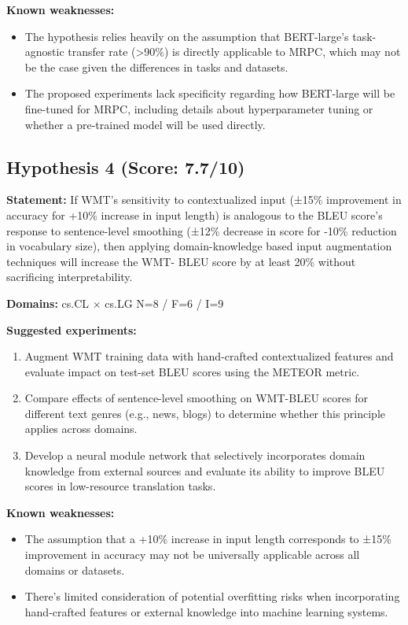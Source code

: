 \documentclass[12pt,a4paper]{article}
\begin{document}
\textbf{Known weaknesses:}
\begin{itemize}
  \item The hypothesis relies heavily on the assumption that BERT-large's task-agnostic transfer rate (>90\%) is directly applicable to MRPC, which may not be the case given the differences in tasks and datasets.
  \item The proposed experiments lack specificity regarding how BERT-large will be fine-tuned for MRPC, including details about hyperparameter tuning or whether a pre-trained model will be used directly.
\end{itemize}
\subsection*{Hypothesis 4 (Score: 7.7/10)}

\textbf{Statement:} If WMT's sensitivity to contextualized input (±15\% improvement in accuracy for +10\% increase in input length) is analogous to the BLEU score's response to sentence-level smoothing (±12\% decrease in score for -10\% reduction in vocabulary size), then applying domain-knowledge based input augmentation techniques will increase the WMT- BLEU score by at least 20\% without sacrificing interpretability.

\noindent\textbf{Domains:} cs.CL $\times$ cs.LG
\hspace{1em} N=8 / F=6 / I=9

\textbf{Suggested experiments:}
\begin{enumerate}
  \item Augment WMT training data with hand-crafted contextualized features and evaluate impact on test-set BLEU scores using the METEOR metric.
  \item Compare effects of sentence-level smoothing on WMT-BLEU scores for different text genres (e.g., news, blogs) to determine whether this principle applies across domains.
  \item Develop a neural module network that selectively incorporates domain knowledge from external sources and evaluate its ability to improve BLEU scores in low-resource translation tasks.
\end{enumerate}

\textbf{Known weaknesses:}
\begin{itemize}
  \item The assumption that a +10\% increase in input length corresponds to ±15\% improvement in accuracy may not be universally applicable across all domains or datasets.
  \item There's limited consideration of potential overfitting risks when incorporating hand-crafted features or external knowledge into machine learning systems.
\end{itemize}
\end{document}
